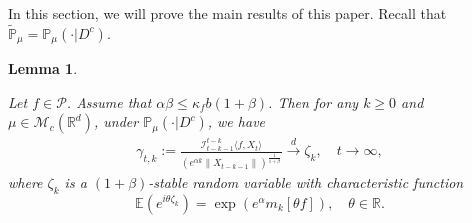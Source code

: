 \documentclass[12pt,oneside,english]{amsart}
\theoremstyle{plain}
\newtheorem{lem}[thm]{Lemma}
\theoremstyle{definition}
\numberwithin{equation}{section}
\begin{document}
In this section, we will prove the main results of this paper. Recall that $\mathbb{\tilde{P}}_{\mu}=\mathbb{P}_{\mu}(\cdot|D^c)$.
\begin{comment}
\begin{lem}\label{lemma32}
    Write $\mathcal{A}_t(\epsilon)=\{\|X_t\|\in\|\mu\|(e^{(\alpha-\epsilon)t},e^{(\alpha+\epsilon)t})\},$ for each $\epsilon,t>0$.
    Then for any $\epsilon>0$, we have
\begin{align}
    \lim_{t\rightarrow\infty}\mathcal{A}_t(\epsilon)=D^c, ~~\mathbb{P}_{\mu}\text{-}{\rm a.s}.
\end{align}
\end{lem}
\begin{proof}
    We just need to prove
    \begin{align}
        D^c \subset \liminf_{t\rightarrow\infty}\mathcal{A}_t(\epsilon)\subset \limsup_{t\rightarrow\infty}\mathcal{A}_t(\epsilon)\subset D^c,~~\mathbb{P}_{\mu}\text{-}{\rm a.s}.
    \end{align}

    On one hand, let $\omega\in D$. Then there exists $T(\omega)>0$, such that $\|X_t(\omega)\|=0,$ for each $t\geq T(\omega)$.
    Thus $\omega\notin  \limsup_{t\rightarrow\infty}\mathcal{A}_t(\epsilon)=\cap_{s\geq 0}\cup_{t\geq s}\mathcal{A}_t(\epsilon)$.
    This implies that $\limsup_{t\rightarrow\infty}\mathcal{A}_t(\epsilon)\subset D^c$.


    On the other hand, let $\omega \in \{H_{\infty}>0\}\cap\{\lim_{t\rightarrow \infty} H_t=H_{\infty}\}$.
    Then, there exists $\delta>0$ such that $H_{\infty}(\omega)\in(\delta,\frac{1}{\delta})$ and there exists $S_1>0$ such that for any $t\geq S_1$, we have $\frac{\delta}{2}\leq H_t(\omega)\leq 2\delta$.
    Taking $S_2>0$ such that for any $t>S_2$, $\|\mu\|e^{-\epsilon t}<\frac{\delta}{2}$ and $\|\mu\|e^{\epsilon t}>2\delta$.
    Then $\omega\in \mathcal{A}_t(\epsilon),$ for each $t>S:=\max\{S_1,S_2\}$.
    This implies that $\omega \in \liminf_{t\rightarrow \infty}\mathcal{A}_t(\epsilon):=\cup_{s>0}\cap_{t\geq s}\mathcal{A}_t(\epsilon)$.
    According to \cite{LSR}, $D^c=\{H_{\infty}>0\}\cap\{\lim_{t\rightarrow \infty} H_t=H_{\infty}\}, \mathbb{P}_{\mu}$-a.s.. Using this we get the desired result.
\end{proof}
\end{comment}
\begin{lem}\label{lem: mainlemma}

Let $f\in \mathcal{P}$.
Assume that $\alpha\beta\leq \kappa_fb(1+\beta)$.
Then for any $k\geq 0$ and $\mu \in \mathcal{M}_c(\mathbb{R}^d)$, under $\mathbb{P}_{\mu}(\cdot | D ^c)$, we have
 \begin{align}
      \gamma_{t,k}:=\frac{\mathcal I_{t-k-1}^{t-k}\langle f ,X_t\rangle}{(e^{\alpha k}\|X_{t-k-1}\|)^{\frac{1}{1+\beta}}}\xrightarrow{d}\zeta_k, \quad t\rightarrow \infty, \label{limitdistribution1}
 \end{align}
 where $\zeta_k$ is a $(1+\beta)$-stable random variable with characteristic function
 $$\mathbb{E}(e^{i\theta\zeta_k})=\exp(e^{\alpha}m_k[\theta f]),\quad \theta \in \mathbb R.$$
 \end{lem}
\end{document}
